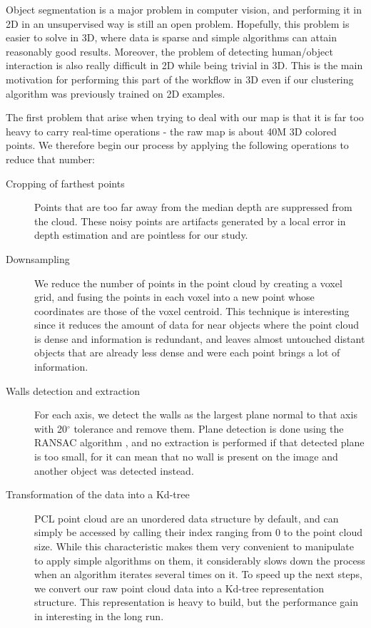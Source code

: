 Object segmentation is a major problem in computer vision, and performing it in 2D in an unsupervised way is still an open problem. Hopefully, this problem is easier to solve in 3D, where data is sparse and simple algorithms can attain reasonably good results. Moreover, the problem of detecting human/object interaction is also really difficult in 2D while being trivial in 3D. This is the main motivation for performing this part of the workflow in 3D even if our clustering algorithm was previously trained on 2D examples.

The first problem that arise when trying to deal with our map is that it is far too heavy to carry real-time operations - the raw map is about 40M 3D colored points. We therefore begin our process by applying the following operations to reduce that number:

\begin{description}
    \item[Cropping of farthest points] Points that are too far away from the median depth are suppressed from the cloud. These noisy points are artifacts generated by a local error in depth estimation and are pointless for our study.

    \item[Downsampling] We reduce the number of points in the point cloud by creating a voxel grid, and fusing the points in each voxel into a new point whose coordinates are those of the voxel centroid. This technique is interesting since it reduces the amount of data for near objects where the point cloud is dense and information is redundant, and leaves almost untouched distant objects that are already less dense and were each point brings a lot of information.

    \item[Walls detection and extraction] For each axis, we detect the walls as the largest plane normal to that axis with 20$^\circ$ tolerance and remove them. Plane detection is done using the RANSAC algorithm \cite{RANSAC}, and no extraction is performed if that detected plane is too small, for it can mean that no wall is present on the image and another object was detected instead.

    \item[Transformation of the data into a Kd-tree] PCL point cloud are an unordered data structure by default, and can simply be accessed by calling their index ranging from 0 to the point cloud size. While this characteristic makes them very convenient to manipulate to apply simple algorithms on them, it considerably slows down the process when an algorithm iterates several times on it. To speed up the next steps, we convert our raw point cloud data into a Kd-tree representation structure. This representation is heavy to build, but the performance gain in interesting in the long run.
\end{description}

